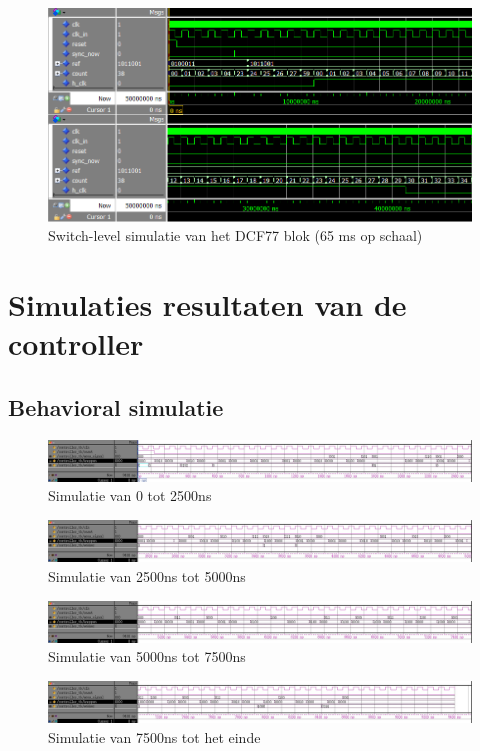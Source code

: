 \begin{figure}[ht!]
\includegraphics[width=\textwidth,height=\textheight,keepaspectratio]{Figuren/DCF77/Mod60_teller.png}
\caption{Switch-level simulatie van het DCF77 blok (65 ms op schaal)}
\end{figure}


\chapter[Simulatie resultaten]{Simulaties resultaten van de controller}
\label{Ap:sim_controller}
\section{Behavioral simulatie}
\begin{figure}[ht!]
\includegraphics[width=\textwidth,height=\textheight,keepaspectratio]{Figuren/Controller/wave0-2_5_inv.jpg}
\caption{Simulatie van 0 tot 2500ns}
\label{fig:sim_beh_0-2_5}
\end{figure}
\begin{figure}[ht!]
\includegraphics[width=\textwidth,height=\textheight,keepaspectratio]{Figuren/Controller/wave2_5-5_inv.jpg}
\caption{Simulatie van 2500ns tot 5000ns}
\label{fig:sim_beh_2_5-5}
\end{figure}
\begin{figure}[ht!]
\includegraphics[width=\textwidth,height=\textheight,keepaspectratio]{Figuren/Controller/wave5-7_5_inv.jpg}
\caption{Simulatie van 5000ns tot 7500ns}
\label{fig:sim_beh_5-7_5}
\end{figure}
\begin{figure}[ht!]
\includegraphics[width=\textwidth,height=\textheight,keepaspectratio]{Figuren/Controller/wave7_5-_inv.jpg}
\caption{Simulatie van 7500ns tot het einde}
\label{fig:sim_beh_7_5-}
\end{figure}
\newpage
